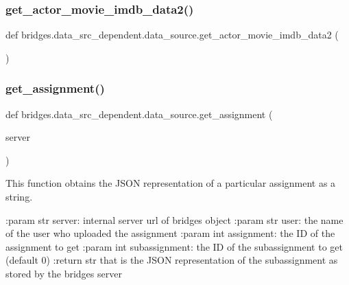 \subsubsection{\texorpdfstring{get\+\_\+actor\+\_\+movie\+\_\+imdb\+\_\+data2()}{get\_actor\_movie\_imdb\_data2()}}
{\footnotesize\ttfamily def bridges.\+data\+\_\+src\+\_\+dependent.\+data\+\_\+source.\+get\+\_\+actor\+\_\+movie\+\_\+imdb\+\_\+data2 (\begin{DoxyParamCaption}{ }\end{DoxyParamCaption})}

\mbox{\label{namespacebridges_1_1data__src__dependent_1_1data__source_add1ea37030fe616297d99cfdf4ae890d}} 
\subsubsection{\texorpdfstring{get\+\_\+assignment()}{get\_assignment()}}
{\footnotesize\ttfamily def bridges.\+data\+\_\+src\+\_\+dependent.\+data\+\_\+source.\+get\+\_\+assignment (\begin{DoxyParamCaption}\item[{}]{server }\end{DoxyParamCaption})}



This function obtains the J\+S\+ON representation of a particular assignment as a string. 

\+:param str server\+: internal server url of bridges object \+:param str user\+: the name of the user who uploaded the assignment \+:param int assignment\+: the ID of the assignment to get \+:param int subassignment\+: the ID of the subassignment to get (default 0) \+:return str that is the J\+S\+ON representation of the subassignment as stored by the bridges server \mbox{\label{namespacebridges_1_1data__src__dependent_1_1data__source_ac711dee7446daedd503ce0f091a5f85e}} 
